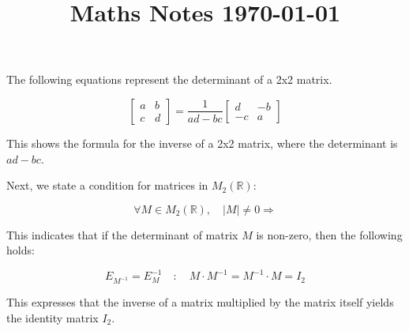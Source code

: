 \documentclass{article}
\title{Maths Notes \today}
\begin{document}
\maketitle

The following equations represent the determinant of a 2x2 matrix. 

\[
\begin{bmatrix}
a & b \\
c & d
\end{bmatrix}
=
\frac{1}{ad - bc}
\begin{bmatrix}
d & -b \\
-c & a
\end{bmatrix}
\]

This shows the formula for the inverse of a 2x2 matrix, where the determinant is \( ad - bc \).

Next, we state a condition for matrices in \( M_2(\mathbb{R}) \):

\[
\forall M \in M_2(\mathbb{R}), \quad |M| \neq 0 \Rightarrow
\]

This indicates that if the determinant of matrix \( M \) is non-zero, then the following holds:

\[
E_{M^{-1}} = E_{M}^{-1} \quad : \quad M \cdot M^{-1} = M^{-1} \cdot M = I_2
\]

This expresses that the inverse of a matrix multiplied by the matrix itself yields the identity matrix \( I_2 \).
\end{document}
